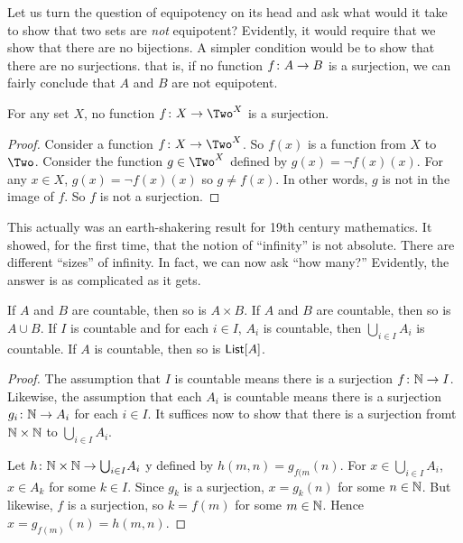 Let us turn the question of equipotency on its head and ask what would it take to show that two sets are \emph{not} equipotent? Evidently, it would require that we show that there are no bijections. A simpler condition would be to show that there are no surjections. that is, if no function ${f}\colon{A}\to{B}$ is a surjection, we can fairly conclude that $A$ and $B$ are not equipotent. 

\begin{theorem}
	For any set $X$, no function $\fromto f{X}{\Two^X}$ is a surjection.
	
	\begin{proof}
		Consider a function $\fromto fX{\Two^X}$. So $f(x)$ is a function from $X$ to $\Two$. Consider the function $g\in \Two^X$ defined by $g(x)= \neg f(x)(x)$. For any $x\in X$, $g(x) = \neg f(x)(x)$ so $g\neq f(x)$.
		In other words, $g$ is not in the image of $f$. So $f$ is not a surjection.
	\end{proof}
\end{theorem}

This actually was an earth-shakering result for 19th century mathematics. It showed, for the first time, that the notion of ``infinity'' is not absolute. There are different ``sizes'' of infinity. In fact, we can now ask ``how many?'' Evidently, the answer is as complicated as it gets. 

\begin{lemma}
	If $A$ and $B$ are countable, then so is $A\times B$.
	If $A$ and $B$ are countable, then so is $A\cup B$.
	If $I$ is countable and for each $i\in I$, $A_i$ is countable, then $\bigcup_{i\in I}A_i$ is countable.
	If $A$ is countable, then so is $\mathord{\textsf{List}}[A]$.
	
	\begin{proof}
		The assumption that $I$ is countable means there is a surjection ${f}\colon{\mathbb N}\to{I}$. Likewise, the assumption that each $A_i$ is countable means there is a surjection ${g_i}\colon{\mathbb N}\to{A_i}$ for each $i\in I$. It suffices now to show that there is a surjection fromt $\mathbb N\times \mathbb N$ to $\bigcup_{i\in I}A_i$.
		
		Let ${h}\colon{\mathbb N\times \mathbb N}\to{\bigcup}_{i\in I}A_i$ y defined by $h(m,n) = g_{f(m}(n)$. For $x\in \bigcup_{i\in I}A_i$, $x\in  A_k$ for some $k\in I$. Since $g_k$ is a surjection, $x = g_k(n)$ for some $n\in\mathbb N$. 
		But likewise, $f$ is a surjection, so $k = f(m)$ for some $m\in\mathbb N$. 
		Hence $x = g_{f(m)}(n) = h(m,n)$.
	\end{proof}
\end{lemma}

